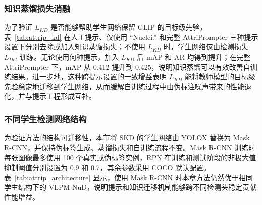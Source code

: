 \subsubsection{知识蒸馏损失消融}

为了验证 $L_{KD}$ 是否能够帮助学生网络保留 GLIP 的目标级先验，表~\ref{tab:attrip_kd} 在人工提示、仅使用 ``Nuclei.'' 和完整 AttriPrompter 三种提示设置下分别去除或加入知识蒸馏损失；不使用 $L_{KD}$ 时，学生网络仅由检测损失 $L_{Det}$ 训练。无论使用何种提示，加入 $L_{KD}$ 后 mAP 和 AR 均得到提升；在完整 AttriPrompter 下，mAP 从 0.412 提升到 0.425，说明知识蒸馏可以有效改善自训练结果。进一步地，这种跨提示设置的一致增益表明 $L_{KD}$ 能将教师模型的目标级先验稳定地迁移到学生网络，从而缓解自训练过程中由伪标注噪声带来的性能退化，并与提示工程形成互补。

\begin{table}[t]
\caption{知识蒸馏损失消融}
\label{tab:attrip_kd}
\begin{center}
\end{center}
\end{table}
\subsubsection{不同学生检测网络结构}

为验证方法的结构可迁移性，本节将 SKD 的学生网络由 YOLOX 替换为 Mask R-CNN，并保持伪标签生成、蒸馏损失和自训练流程不变。Mask R-CNN 训练时每张图像最多使用 100 个真实或伪标签实例，RPN 在训练和测试阶段的非极大值抑制阈值分别设置为 0.9 和 0.7，其余参数采用 COCO 默认配置。表~\ref{tab:attrip_architecture} 显示，使用 Mask R-CNN 时本章方法仍然优于相同学生结构下的 VLPM-NuD，说明提示和知识迁移机制能够跨不同检测头稳定贡献性能增益。

